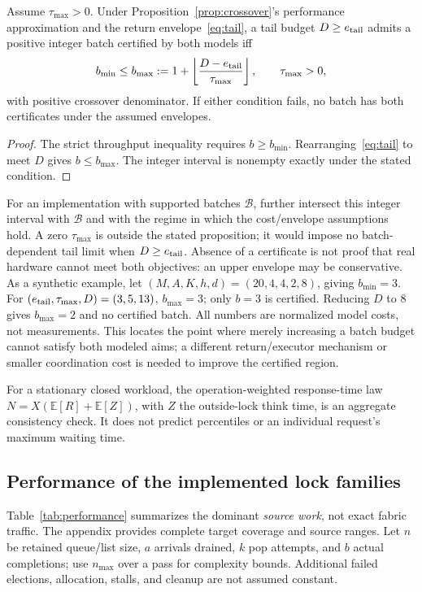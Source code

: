 \begin{proposition}
\label{prop:frontier}
Assume $\tau_{\max}>0$. Under
Proposition~\ref{prop:crossover}'s performance approximation and the
return envelope~\eqref{eq:tail}, a tail budget $D\ge e_{\rm tail}$ admits a
positive integer batch certified by both models iff
\begin{equation}
 b_{\min}\le b_{\max}:=
 1+\left\lfloor\frac{D-e_{\rm tail}}{\tau_{\max}}\right\rfloor,
 \qquad \tau_{\max}>0,
\end{equation}
with positive crossover denominator. If either condition fails, no batch
has both certificates under the assumed envelopes.
\end{proposition}
\begin{proof}
The strict throughput inequality requires $b\ge b_{\min}$.
Rearranging~\eqref{eq:tail} to meet $D$ gives $b\le b_{\max}$.
The integer interval is nonempty exactly under the stated condition.
\end{proof}
For an implementation with supported batches $\mathcal B$, further intersect
this integer interval with $\mathcal B$ and with the regime in which the
cost/envelope assumptions hold. A zero $\tau_{\max}$ is outside the stated
proposition; it would impose no batch-dependent tail limit when
$D\ge e_{\rm tail}$.
Absence of a certificate is not proof that real hardware cannot meet both
objectives: an upper envelope may be conservative. As a synthetic example,
let $(M,A,K,h,d)=(20,4,4,2,8)$, giving $b_{\min}=3$.
For $(e_{\rm tail},\tau_{\max},D)=(3,5,13)$, $b_{\max}=3$;
only $b=3$ is certified. Reducing $D$ to 8 gives $b_{\max}=2$ and no
certified batch. All numbers are normalized model costs, not measurements.
This locates the point where merely increasing a batch budget cannot satisfy
both modeled aims; a different return/executor mechanism or smaller
coordination cost is needed to improve the certified region.

For a stationary closed workload, the operation-weighted response-time law
$N=X(\mathbb E[R]+\mathbb E[Z])$, with $Z$ the outside-lock think time,
is an aggregate consistency check. It does not predict percentiles or an
individual request's maximum waiting time.

\subsection{Performance of the implemented lock families}
\label{sec:instances}
Table~\ref{tab:performance} summarizes the dominant \emph{source work}, not exact
fabric traffic. The appendix provides complete target coverage and source
ranges. Let $n$ be retained queue/list size, $a$ arrivals drained, $k$ pop
attempts, and $b$ actual completions; use $n_{\max}$ over a pass for complexity
bounds. Additional failed elections, allocation, stalls, and cleanup are
not assumed constant.

